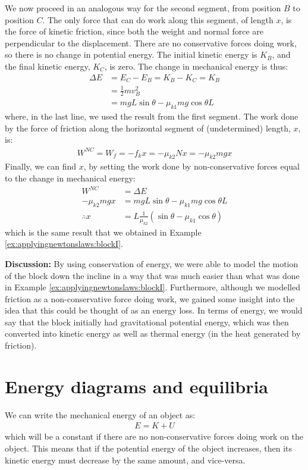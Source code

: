 \begin{example}
We now proceed in an analogous way for the second segment, from position $B$ to position $C$. The only force that can do work along this segment, of length $x$, is the force of kinetic friction, since both the weight and normal force are perpendicular to the displacement. There are no conservative forces doing work, so there is no change in potential energy. The initial kinetic energy is $K_B$, and the final kinetic energy, $K_C$, is zero. The change in mechanical energy is thus:
\begin{align*}
\Delta E &= E_C - E_B = K_B - K_C = K_B\\
&=\frac{1}{2}mv_B^2\\
&= mgL\sin\theta-\mu_{k1}mg\cos\theta L 
\end{align*}
where, in the last line, we used the result from the first segment. The work done by the force of friction along the horizontal segment of (undetermined) length, $x$, is:
\begin{align*}
W^{NC}=W_f = -f_kx = -\mu_{k2} N x=-\mu_{k2} mg x
\end{align*}
Finally, we can find $x$, by setting the work done by non-conservative forces equal to the change in mechanical energy:
\begin{align*}
W^{NC} &= \Delta E\\
-\mu_{k2} mg x &= mgL\sin\theta-\mu_{k1}mg\cos\theta L \\
\therefore x&= L\frac{1}{\mu_{k2}}\left(\sin\theta - \mu_{k1}\cos\theta\right)
\end{align*}
which is the same result that we obtained in Example \ref{ex:applyingnewtonslaws:blockI}.

\textbf{Discussion:} By using conservation of energy, we were able to model the motion of the block down the incline in a way that was much easier than what was done in Example \ref{ex:applyingnewtonslaws:blockI}. Furthermore, although we modelled friction as a non-conservative force doing work, we gained some insight into the idea that this could be thought of as an energy loss. In terms of energy, we would say that the block initially had gravitational potential energy, which was then converted into kinetic energy as well as thermal energy (in the heat generated by friction). 
\end{example}

\section{Energy diagrams and equilibria}
We can write the mechanical energy of an object as:
\begin{align*}
E = K + U
\end{align*}
which will be a constant if there are no non-conservative forces doing work on the object. This means that if the potential energy of the object increases, then its kinetic energy must decrease by the same amount, and vice-versa. 

